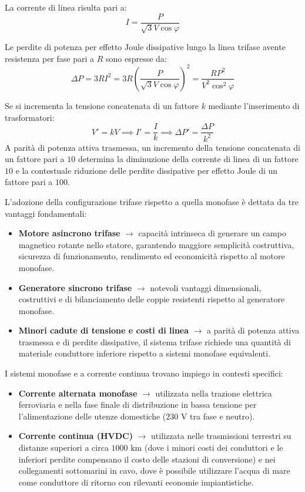 La corrente di linea risulta pari a:
\[I = \frac{P}{\sqrt{3} V \cos\varphi}\]

Le perdite di potenza per effetto Joule dissipative lungo la linea trifase avente resistenza per fase pari a $R$ sono espresse da:
\[\Delta P = 3 R I^2 = 3 R \left( \frac{P}{\sqrt{3} V \cos\varphi} \right)^2 = \frac{R P^2}{V^2 \cos^2\varphi}\]

Se si incrementa la tensione concatenata di un fattore $k$ mediante l'inserimento di trasformatori:
\[V' = k V \implies I' = \frac{I}{k} \implies \Delta P' = \frac{\Delta P}{k^2}\]
A parità di potenza attiva trasmessa, un incremento della tensione concatenata di un fattore pari a $10$ determina la diminuzione della corrente di linea di un fattore $10$ e la contestuale riduzione delle perdite dissipative per effetto Joule di un fattore pari a $100$.

\newpage
L'adozione della configurazione trifase rispetto a quella monofase è dettata da tre vantaggi fondamentali:
\begin{itemize}
    \item \textbf{Motore asincrono trifase} $\rightarrow$ capacità intrinseca di generare un campo magnetico rotante nello statore, garantendo maggiore semplicità costruttiva, sicurezza di funzionamento, rendimento ed economicità rispetto al motore monofase.
    \item \textbf{Generatore sincrono trifase} $\rightarrow$ notevoli vantaggi dimensionali, costruttivi e di bilanciamento delle coppie resistenti rispetto al generatore monofase.
    \item \textbf{Minori cadute di tensione e costi di linea} $\rightarrow$ a parità di potenza attiva trasmessa e di perdite dissipative, il sistema trifase richiede una quantità di materiale conduttore inferiore rispetto a sistemi monofase equivalenti.
\end{itemize}

I sistemi monofase e a corrente continua trovano impiego in contesti specifici:
\begin{itemize}
    \item \textbf{Corrente alternata monofase} $\rightarrow$ utilizzata nella trazione elettrica ferroviaria e nella fase finale di distribuzione in bassa tensione per l'alimentazione delle utenze domestiche ($230\text{ V}$ tra fase e neutro).
    \item \textbf{Corrente continua (HVDC)} $\rightarrow$ utilizzata nelle trasmissioni terrestri su distanze superiori a circa $1000\text{ km}$ (dove i minori costi dei conduttori e le inferiori perdite compensano il costo delle stazioni di conversione) e nei collegamenti sottomarini in cavo, dove è possibile utilizzare l'acqua di mare come conduttore di ritorno con rilevanti economie impiantistiche.
\end{itemize}

